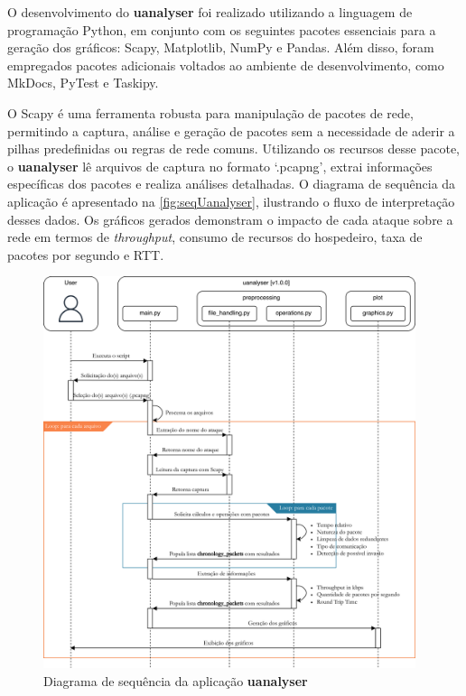         O desenvolvimento do \textbf{uanalyser} foi realizado utilizando a linguagem de programação Python, em conjunto com os seguintes pacotes essenciais para a geração dos gráficos: Scapy, Matplotlib, NumPy e Pandas. Além disso, foram empregados pacotes adicionais voltados ao ambiente de desenvolvimento, como MkDocs, PyTest e Taskipy.
        
        O Scapy é uma ferramenta robusta para manipulação de pacotes de rede, permitindo a captura, análise e geração de pacotes sem a necessidade de aderir a pilhas predefinidas ou regras de rede comuns. Utilizando os recursos desse pacote, o \textbf{uanalyser} lê arquivos de captura no formato `.pcapng', extrai informações específicas dos pacotes e realiza análises detalhadas. O diagrama de sequência da aplicação é apresentado na \autoref{fig:seqUanalyser}, ilustrando o fluxo de interpretação desses dados. Os gráficos gerados demonstram o impacto de cada ataque sobre a rede em termos de \textit{throughput}, consumo de recursos do hospedeiro, taxa de pacotes por segundo e RTT.    

        \begin{figure}[htbp!]
            \caption{\label{fig:seqUanalyser}Diagrama de sequência da aplicação \textbf{uanalyser}}
            \begin{center}
                \includegraphics[width=0.972\textwidth]{USPSC-img/seqUanalyser.png}
            \end{center}
        \end{figure}

